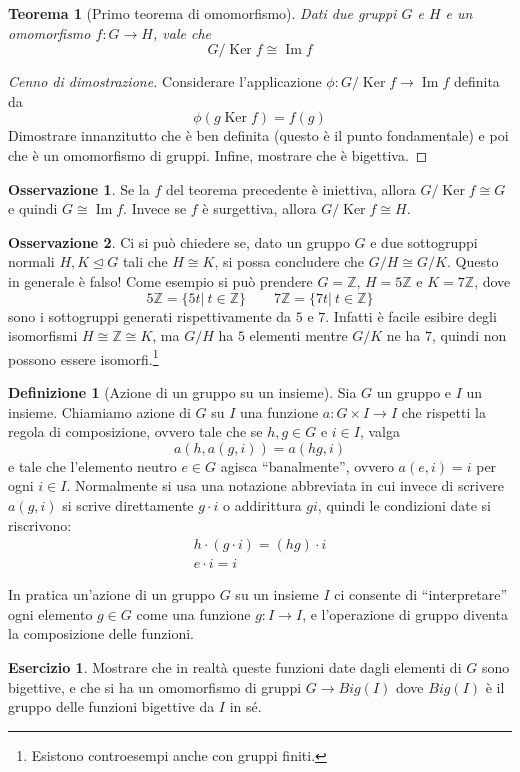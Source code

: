 \documentclass[11pt]{article}
\theoremstyle{plain}
\newtheorem{thm}{Teorema}[section]
\theoremstyle{definition}
\newtheorem{defn}{Definizione}[section]
\newtheorem{exercise}{Esercizio}[section]
\newtheorem*{rem}{Osservazione}
\theoremstyle{remark}
\newcommand{\Z}{\mathbb{Z}}
\DeclareMathOperator{\Ker}{Ker}
\DeclareMathOperator{\Imm}{Im}
\begin{document}
\begin{thm}[Primo teorema di omomorfismo]\label{alg:primo_teo_omo}
	Dati due gruppi $G$ e $H$ e un omomorfismo $f:G\to H$, vale che
	\[ G/\Ker f \cong \Imm f\]
\end{thm}
\begin{proof}[Cenno di dimostrazione]
	Considerare l'applicazione $\phi:G/\Ker f \to \Imm f$ definita da 
	\[\phi(g\Ker f) = f(g)\]
	Dimostrare innanzitutto che è ben definita (questo è il punto fondamentale) e poi che è un omomorfismo di gruppi. Infine, mostrare che è bigettiva.
\end{proof}
\begin{rem}
	Se la $f$ del teorema precedente è iniettiva, allora $G/\Ker f\cong G$ e quindi $G\cong \Imm f$. Invece se $f$ è surgettiva, allora $G/\Ker f\cong H$.
\end{rem}

\begin{rem}
	Ci si può chiedere se, dato un gruppo $G$ e due sottogruppi normali $H,K\trianglelefteq G$ tali che $H\cong K$, si possa concludere che $G/H\cong G/K$. Questo in generale è falso! Come esempio si può prendere $G=\Z$, $H=5\Z$ e $K=7\Z$, dove
	\[5\Z=\{ 5t|\ t\in \Z\}\qquad 7\Z=\{ 7t|\ t\in \Z\}\]
	sono i sottogruppi generati rispettivamente da $5$ e $7$.
	Infatti è facile esibire degli isomorfismi $H\cong \Z\cong K$, ma $G/H$ ha $5$ elementi mentre $G/K$ ne ha $7$, quindi non possono essere isomorfi.\footnote{Esistono controesempi anche con gruppi finiti.}
\end{rem}


\begin{defn}[Azione di un gruppo su un insieme] Sia $G$ un gruppo e $I$ un insieme. Chiamiamo azione di $G$ su $I$ una funzione $a:G\times I \to I$ che rispetti la regola di composizione, ovvero tale che se $h,g\in G$ e $i \in I$, valga
\[ a(h,a(g,i)) = a(hg, i) \]
e tale che l'elemento neutro $e\in G$ agisca ``banalmente'', ovvero $a(e, i) = i$ per ogni $i\in I$.
Normalmente si usa una notazione abbreviata in cui invece di scrivere $a(g,i)$ si scrive direttamente $g\cdot i$ o addirittura $gi$, quindi le condizioni date si riscrivono:
\begin{gather*}
	h\cdot(g\cdot i) = (hg)\cdot i\\
	e\cdot i = i
\end{gather*}
\label{defn:azione}
\end{defn}

In pratica un'azione di un gruppo $G$ su un insieme $I$ ci consente di ``interpretare'' ogni elemento $g\in G$ come una funzione $g:I\to I$, e l'operazione
di gruppo diventa la composizione delle funzioni.
\begin{exercise}
Mostrare che in realtà queste funzioni date dagli elementi di $G$ sono bigettive, e che si ha un omomorfismo di gruppi $G\to Big(I)$ dove $Big(I)$ è il gruppo delle funzioni bigettive da $I$ in sé.
\end{exercise}
\end{document}
